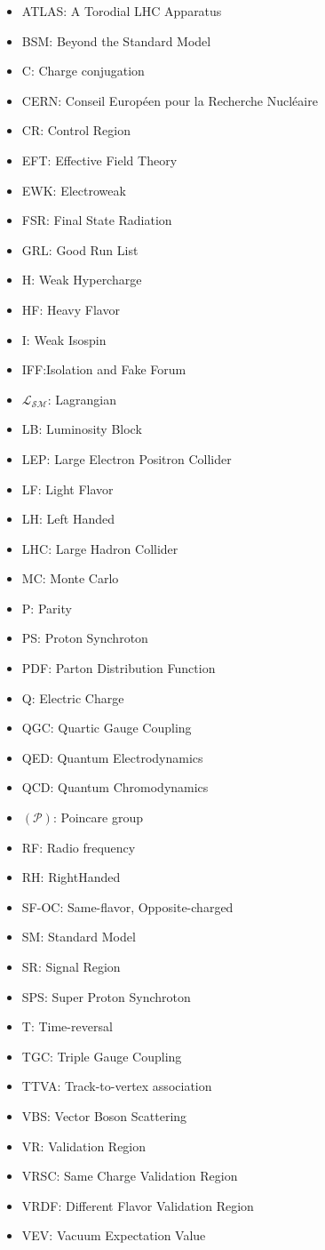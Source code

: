 \begin{itemize}
\item{ATLAS: A Torodial LHC Apparatus}
\item{BSM: Beyond the Standard Model}
\item{C: Charge conjugation}
\item{CERN: Conseil Europ\'{e}en pour la Recherche Nucl\'{e}aire}
\item{CR: Control Region}
\item{EFT: Effective Field Theory}
\item{EWK: Electroweak}
\item{FSR: Final State Radiation}
\item{GRL: Good Run List}
\item{H: Weak Hypercharge}
\item{HF: Heavy Flavor}
\item{I: Weak Isospin}
\item{IFF:Isolation and Fake Forum}
\item{$\mathcal{L_{SM}}$: Lagrangian}
\item{LB: Luminosity Block}
\item{LEP: Large Electron Positron Collider} 
\item{LF: Light Flavor} 
\item{LH:  Left Handed}
\item{LHC: Large Hadron Collider}
\item{MC: Monte Carlo}
\item{P: Parity}
\item{PS: Proton Synchroton}
\item{PDF: Parton Distribution Function}
\item{Q: Electric Charge}
\item{QGC: Quartic Gauge Coupling}
\item{QED: Quantum Electrodynamics}
\item{QCD: Quantum Chromodynamics}
\item{$(\mathcal{P})$: Poincare group}
\item{RF: Radio frequency}
\item{RH: RightHanded}
\item{SF-OC: Same-flavor, Opposite-charged} 
\item{SM: Standard Model}
\item{SR: Signal Region}
\item{SPS: Super Proton Synchroton} 
\item{T: Time-reversal}
\item{TGC: Triple Gauge Coupling}
\item{TTVA: Track-to-vertex association}
\item{VBS: Vector Boson Scattering}
\item{VR: Validation Region}
\item{VRSC: Same Charge Validation Region}
\item{VRDF: Different Flavor Validation Region}
\item{VEV: Vacuum Expectation Value}
\end{itemize}
